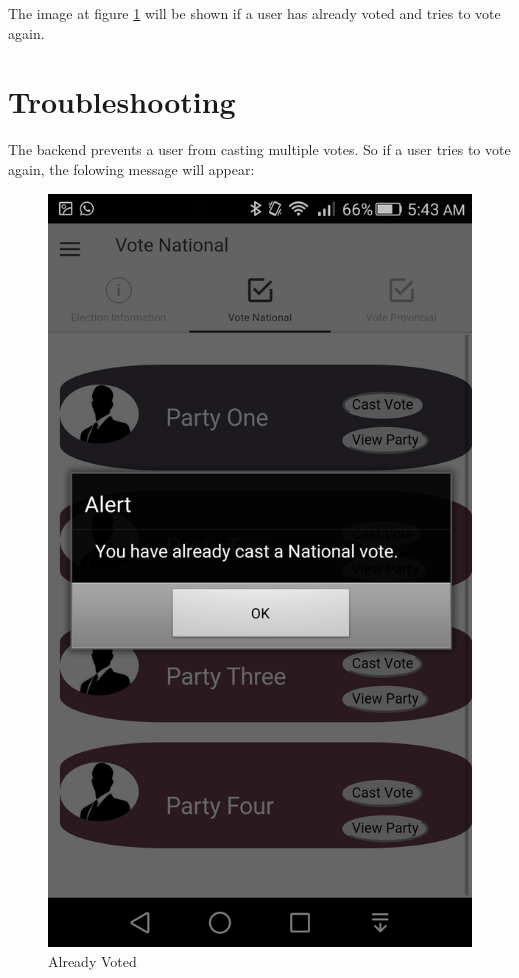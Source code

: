 \documentclass[11pt]{article}
\begin{document}
		The image at figure \ref{alreadyVoted} will be shown if a user has already voted and tries to vote again.
	
		\section{Troubleshooting}
		The backend prevents a user from casting multiple votes. So if a user tries to vote again, the folowing message will appear:
		\begin{figure}[H]
			\centering
			\includegraphics[width=0.3\linewidth]{../Images/UserManual/alreadyvoted.png}
			\caption{Already Voted}
			\label{alreadyVoted}
		\end{figure}
\end{document}
